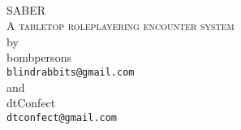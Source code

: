 \begin{titlepage}
\begin{center}

~\\[1.0cm]

\textsc{\LARGE SABER}\\
\textsc{\Large A tabletop roleplayering encounter system}\\[3.0cm]

{\normalsize by}\\
{\Large bombpersons}\\
{\Large \nolinkurl{blindrabbits@gmail.com}}\\[3.0cm]

{\normalsize and}\\
{\Large dtConfect}\\
{\Large \nolinkurl{dtconfect@gmail.com}}\\[3.0cm]

\vfill

\end{center}
\end{titlepage}